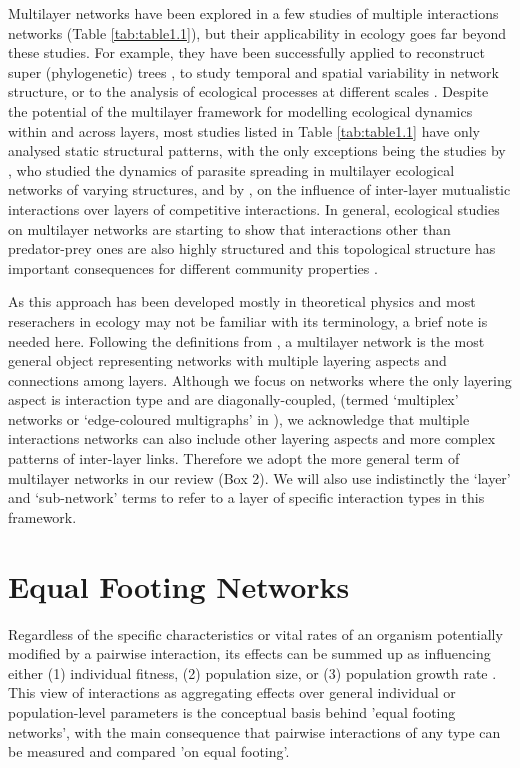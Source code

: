 Multilayer networks have been explored in a few studies of multiple interactions networks (Table \ref{tab:table1.1}), but their applicability in ecology goes far beyond these studies. For example, they have been successfully applied to reconstruct super (phylogenetic) trees \citep{vonHaeseler2012}, to study temporal and spatial variability in network structure, or to the analysis of ecological processes at different scales \citep{Pilosof2017} . Despite the potential of the multilayer framework for modelling ecological dynamics within and across layers, most studies listed in Table \ref{tab:table1.1} have only analysed static structural patterns, with the only exceptions being the studies by \cite{Stella2016}, who studied the dynamics of parasite spreading in multilayer ecological networks of varying structures, and by \cite{Gracia-Lazaro2018}, on the influence of inter-layer mutualistic interactions over layers of competitive interactions. In general, ecological studies on multilayer networks are starting to show that interactions other than predator-prey ones are also highly structured \citep{Melian2009,Kefi2015} and this topological structure has important consequences for different community properties \citep{Pocock2012, Evans2013a, Kefi2016a}.

As this approach has been developed mostly in theoretical physics and most reserachers in ecology may not be familiar with its terminology, a brief note is needed here. Following the definitions from \cite{Kivela2014}, a multilayer network is the most general object representing networks with multiple layering aspects and connections among layers. Although we focus on networks where the only layering aspect is interaction type and are diagonally-coupled, (termed `multiplex' networks or `edge-coloured multigraphs' in \citealt{Kivela2014}), we acknowledge that multiple interactions networks can also include other layering aspects and more complex patterns of inter-layer links. Therefore we adopt the more general term of multilayer networks in our review (Box 2). We will also use indistinctly the `layer' and `sub-network' terms to refer to a layer of specific interaction types in this framework.

\section{Equal Footing Networks}

Regardless of the specific characteristics or vital rates of an organism potentially modified by a pairwise interaction, its effects can be summed up as influencing either (1) individual fitness, (2) population size, or (3) population growth rate \citep{Abrams1987}. This view of interactions as aggregating effects over general individual or population-level parameters is the conceptual basis behind {}'equal footing networks{}', with the main consequence that pairwise interactions of any type can be measured and compared {}'on equal footing'.

